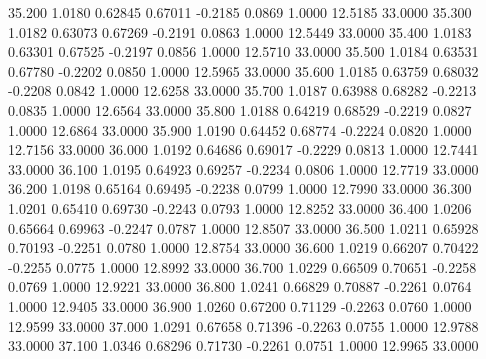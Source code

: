   35.200   1.0180   0.62845   0.67011  -0.2185   0.0869   1.0000  12.5185  33.0000
  35.300   1.0182   0.63073   0.67269  -0.2191   0.0863   1.0000  12.5449  33.0000
  35.400   1.0183   0.63301   0.67525  -0.2197   0.0856   1.0000  12.5710  33.0000
  35.500   1.0184   0.63531   0.67780  -0.2202   0.0850   1.0000  12.5965  33.0000
  35.600   1.0185   0.63759   0.68032  -0.2208   0.0842   1.0000  12.6258  33.0000
  35.700   1.0187   0.63988   0.68282  -0.2213   0.0835   1.0000  12.6564  33.0000
  35.800   1.0188   0.64219   0.68529  -0.2219   0.0827   1.0000  12.6864  33.0000
  35.900   1.0190   0.64452   0.68774  -0.2224   0.0820   1.0000  12.7156  33.0000
  36.000   1.0192   0.64686   0.69017  -0.2229   0.0813   1.0000  12.7441  33.0000
  36.100   1.0195   0.64923   0.69257  -0.2234   0.0806   1.0000  12.7719  33.0000
  36.200   1.0198   0.65164   0.69495  -0.2238   0.0799   1.0000  12.7990  33.0000
  36.300   1.0201   0.65410   0.69730  -0.2243   0.0793   1.0000  12.8252  33.0000
  36.400   1.0206   0.65664   0.69963  -0.2247   0.0787   1.0000  12.8507  33.0000
  36.500   1.0211   0.65928   0.70193  -0.2251   0.0780   1.0000  12.8754  33.0000
  36.600   1.0219   0.66207   0.70422  -0.2255   0.0775   1.0000  12.8992  33.0000
  36.700   1.0229   0.66509   0.70651  -0.2258   0.0769   1.0000  12.9221  33.0000
  36.800   1.0241   0.66829   0.70887  -0.2261   0.0764   1.0000  12.9405  33.0000
  36.900   1.0260   0.67200   0.71129  -0.2263   0.0760   1.0000  12.9599  33.0000
  37.000   1.0291   0.67658   0.71396  -0.2263   0.0755   1.0000  12.9788  33.0000
  37.100   1.0346   0.68296   0.71730  -0.2261   0.0751   1.0000  12.9965  33.0000
